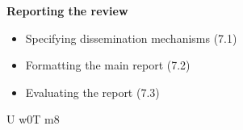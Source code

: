 \documentclass[10pt,twocolumn]{article}
\begin{document}
\textbf{Reporting the review}
\begin{itemize}
\item Specifying dissemination mechanisms (7.1)
\item Formatting the main report (7.2)
\item Evaluating the report (7.3)
\end{itemize} 





U w0T m8
\end{document}
